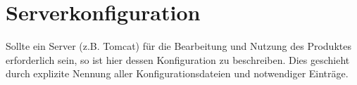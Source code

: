 \chapter{Serverkonfiguration}
Sollte ein Server (z.B. Tomcat) f\"ur die Bearbeitung und Nutzung des Produktes
erforderlich sein, so ist hier dessen Konfiguration zu beschreiben. Dies
geschieht durch explizite Nennung aller Konfigurationsdateien und notwendiger
Eintr\"age.

